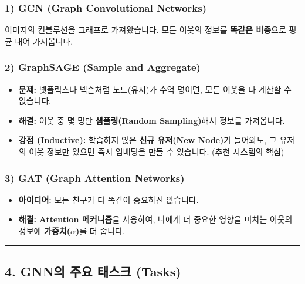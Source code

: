 \documentclass[11pt,a4paper]{book}
\theoremstyle{definition}
\begin{document}
\subsubsection*{1) GCN (Graph Convolutional Networks)}
이미지의 컨볼루션을 그래프로 가져왔습니다. 모든 이웃의 정보를 \textbf{똑같은 비중}으로 평균 내어 가져옵니다.

\subsubsection*{2) GraphSAGE (Sample and Aggregate)}
\begin{itemize}
    \item \textbf{문제:} 넷플릭스나 넥슨처럼 노드(유저)가 수억 명이면, 모든 이웃을 다 계산할 수 없습니다.
    \item \textbf{해결:} 이웃 중 몇 명만 \textbf{샘플링(Random Sampling)}해서 정보를 가져옵니다.
    \item \textbf{강점 (Inductive):} 학습하지 않은 \textbf{신규 유저(New Node)}가 들어와도, 그 유저의 이웃 정보만 있으면 즉시 임베딩을 만들 수 있습니다. (추천 시스템의 핵심)
\end{itemize}

\subsubsection*{3) GAT (Graph Attention Networks)}
\begin{itemize}
    \item \textbf{아이디어:} 모든 친구가 다 똑같이 중요하진 않습니다.
    \item \textbf{해결:} \textbf{Attention 메커니즘}을 사용하여, 나에게 더 중요한 영향을 미치는 이웃의 정보에 \textbf{가중치($\alpha$)}를 더 줍니다.
\end{itemize}

\vspace{0.5cm}\hrule\vspace{0.5cm}

\subsection{4. GNN의 주요 태스크 (Tasks)}
\end{document}
